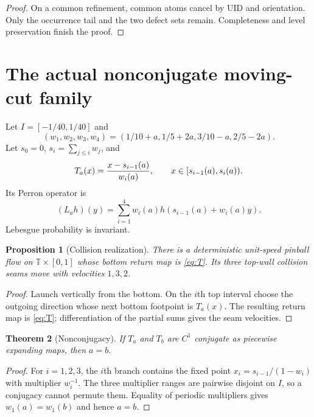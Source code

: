 \documentclass[11pt,reqno]{amsart}
\newtheorem{theorem}{Theorem}[section]
\newtheorem{proposition}[theorem]{Proposition}
\theoremstyle{definition}
\theoremstyle{remark}
\newcommand{\T}{\mathbb T}
\begin{document}
\begin{proof}
On a common refinement, common atoms cancel by UID and orientation.  Only the
occurrence tail and the two defect sets remain.  Completeness and level
preservation finish the proof.
\end{proof}

\section{The actual nonconjugate moving-cut family}\label{sec:model}
Let $I=[-1/40,1/40]$ and
\[
 (w_1,w_2,w_3,w_4)
 =(1/10+a,1/5+2a,3/10-a,2/5-2a).
\]
Let $s_0=0$, $s_i=\sum_{j\le i}w_j$, and
\begin{equation}\label{eq:T}
 T_a(x)={x-s_{i-1}(a)\over w_i(a)},
 \qquad x\in[s_{i-1}(a),s_i(a)).
\end{equation}
Its Perron operator is
\begin{equation}\label{eq:L}
 (L_ah)(y)=\sum_{i=1}^4w_i(a)
 h(s_{i-1}(a)+w_i(a)y).
\end{equation}
Lebesgue probability is invariant.

\begin{proposition}[Collision realization]\label{prop:collision}
There is a deterministic unit-speed pinball flow on $\T\times[0,1]$ whose
bottom return map is \eqref{eq:T}.  Its three top-wall collision seams move
with velocities $1,3,2$.
\end{proposition}

\begin{proof}
Launch vertically from the bottom.  On the $i$th top interval choose the
outgoing direction whose next bottom footpoint is $T_a(x)$.  The resulting
return map is \eqref{eq:T}; differentiation of the partial sums gives the seam
velocities.
\end{proof}

\begin{theorem}[Nonconjugacy]\label{thm:nonconjugacy}
If $T_a$ and $T_b$ are $C^1$ conjugate as piecewise expanding maps, then
$a=b$.
\end{theorem}

\begin{proof}
For $i=1,2,3$, the $i$th branch contains the fixed point
$x_i=s_{i-1}/(1-w_i)$ with multiplier $w_i^{-1}$.  The three multiplier ranges
are pairwise disjoint on $I$, so a conjugacy cannot permute them.  Equality of
periodic multipliers gives $w_1(a)=w_1(b)$ and hence $a=b$.
\end{proof}
\end{document}
